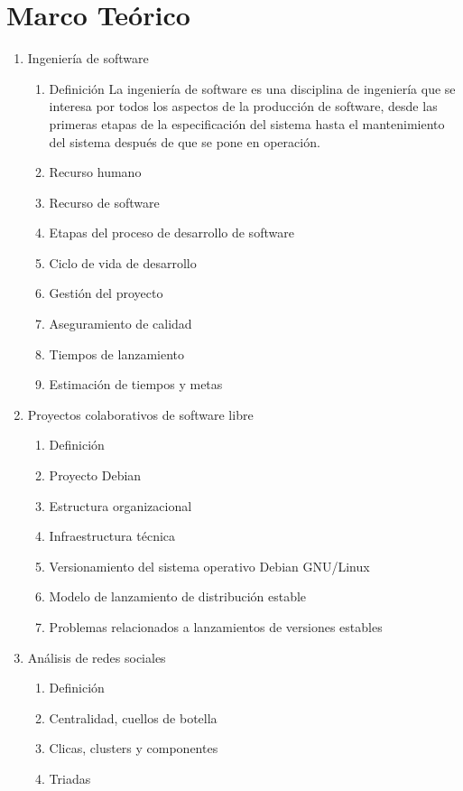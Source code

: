 \documentclass[letterpaper,12pt,titlepage]{report}
\begin{document}
\chapter{Marco Teórico}
\begin{enumerate}
\item Ingeniería de software
  \begin{enumerate}
  \item Definición La ingeniería de software es una disciplina de
    ingeniería que se interesa por todos los aspectos de la producción
    de software, desde las primeras etapas de la especificación del
    sistema hasta el mantenimiento del sistema después de que se pone
    en operación.\cite{9786073206037}
  \item Recurso humano
  \item Recurso de software
  \item Etapas del proceso de desarrollo de software
  \item Ciclo de vida de desarrollo
  \item Gestión del proyecto
  \item Aseguramiento de calidad
  \item Tiempos de lanzamiento
  \item Estimación de tiempos y metas
  \end{enumerate}
\item Proyectos colaborativos de software libre
  \begin{enumerate}
  \item Definición
  \item Proyecto Debian
  \item Estructura organizacional
  \item Infraestructura técnica
  \item Versionamiento del sistema operativo Debian GNU/Linux
  \item Modelo de lanzamiento de distribución estable
  \item Problemas relacionados a lanzamientos de versiones estables
  \end{enumerate}
\item Análisis de redes sociales
  \begin{enumerate}
  \item Definición
  \item Centralidad, cuellos de botella
  \item Clicas, clusters y componentes
  \item Triadas
  \end{enumerate}

\end{enumerate}
\end{document}
